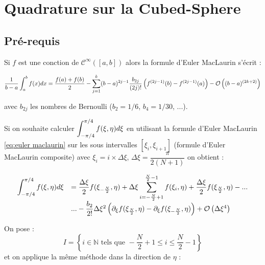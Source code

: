 \section{Quadrature sur la Cubed-Sphere}





\subsection{Pré-requis}

Si $f$ est une conction de $\mathcal{C}^{\infty}([a,b])$ alors la formule d'Euler MacLaurin s'écrit :

\begin{equation}
\dfrac{1}{b-a} \displaystyle\int_a^b f(x)dx = \dfrac{f(a)+f(b)}{2} - \displaystyle\sum\limits_{j=1}^k (b-a)^{2j-1} \dfrac{b_{2j}}{(2j)!} \left( f^{(2j-1)}(b) - f^{(2j-1)}(a) \right) - \mathcal{O}\left( (b-a)^{(2k+2)} \right)
\label{eq:euler maclaurin}
\end{equation}

avec $b_{2j}$ les nombres de Bernoulli ($b_2=1/6$, $b_4=1/30$, ...).

Si on souhaite calculer $\displaystyle\int_{-\pi/4}^{\pi/4} f(\xi,\eta)d\xi$ en utilisant la formule d'Euler MacLaurin \eqref{eq:euler maclaurin} sur les sous intervalles $[\xi_i, \xi_{i+1}]$ (formule d'Euler MacLaurin composite) avec $\xi_i= i \times \Delta \xi$, $\Delta \xi = \dfrac{\pi}{2(N+1)}$ on obtient :

\begin{equation}
\begin{array}{rl}
\displaystyle\int_{-\pi/4}^{\pi/4} f(\xi,\eta)d\xi & = \dfrac{\Delta \xi}{2} f(\xi_{-\frac{N}{2}},\eta) +  \Delta \xi \displaystyle\sum\limits_{i=-\frac{N}{2}+1}^{\frac{N}{2}-1} f(\xi_i,\eta) + \frac{\Delta \xi}{2} f(\xi_{\frac{N}{2}},\eta)- ...\\
                                       & ... - \dfrac{b_2}{2!} \Delta \xi^2 \left( \partial_\xi f(\xi_{\frac{N}{2}},\eta) - \partial_\xi f(\xi_{-\frac{N}{2}},\eta) \right) + \mathcal{O} \left( \Delta \xi ^4 \right)
\end{array}
\end{equation}

On pose : $$I = \left\lbrace i\in\mathbb{N} \text{ tels que } -\frac{N}{2}+1 \leq i \leq \frac{N}{2}-1 \right\rbrace$$ et on applique la même méthode dans la direction de $\eta$  :

